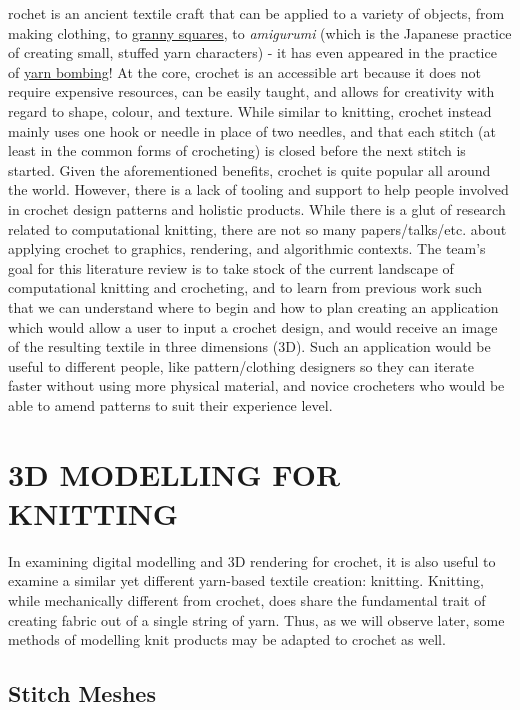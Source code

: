 \documentclass{IEEEcsmag}
\begin{document}
rochet is an ancient textile craft that can be applied to a variety of objects, from making clothing, to \href{https://en.wikipedia.org/wiki/Granny_square}{granny squares}, to \textit{amigurumi} (which is the Japanese practice of creating small, stuffed yarn characters) - it has even appeared in the practice of \href{https://en.wikipedia.org/wiki/Yarn_bombing}{yarn bombing}! At the core, crochet is an accessible art because it does not require expensive resources, can be easily taught, and allows for creativity with regard to shape, colour, and texture. While similar to knitting, crochet instead mainly uses one hook or needle in place of two needles, and that each stitch (at least in the common forms of crocheting) is closed before the next stitch is started. Given the aforementioned benefits, crochet is quite popular all around the world. However, there is a lack of tooling and support to help people involved in crochet design patterns and holistic products. While there is a glut of research related to computational knitting, there are not so many papers/talks/etc. about applying crochet to graphics, rendering, and algorithmic contexts. The team's goal for this literature review is to take stock of the current landscape of computational knitting and crocheting, and to learn from previous work such that we can understand where to begin and how to plan creating an application which would allow a user to input a crochet design, and would receive an image of the resulting textile in three dimensions (3D). Such an application would be useful to different people, like pattern/clothing designers so they can iterate faster without using more physical material, and novice crocheters who would be able to amend patterns to suit their experience level.

\section{3D MODELLING FOR KNITTING}
In examining digital modelling and 3D rendering for crochet, it is also useful to examine a similar yet different yarn-based textile creation: knitting. Knitting, while mechanically different from crochet, does share the fundamental trait of creating fabric out of a single string of yarn. Thus, as we will observe later, some methods of modelling knit products may be adapted to crochet as well. 

\subsection{Stitch Meshes}
\end{document}
